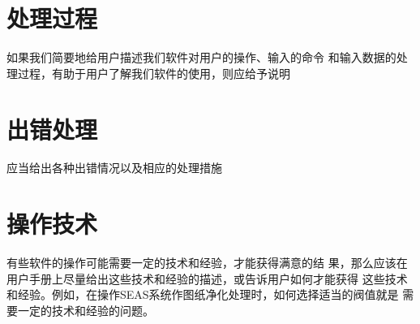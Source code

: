 \section{处理过程}
如果我们简要地给用户描述我们软件对用户的操作、输入的命令
和输入数据的处理过程，有助于用户了解我们软件的使用，则应给予说明
\section{出错处理}
应当给出各种出错情况以及相应的处理措施
\section{操作技术}
有些软件的操作可能需要一定的技术和经验，才能获得满意的结
果，那么应该在用户手册上尽量给出这些技术和经验的描述，或告诉用户如何才能获得
这些技术和经验。例如，在操作SEAS系统作图纸净化处理时，如何选择适当的阀值就是
需要一定的技术和经验的问题。